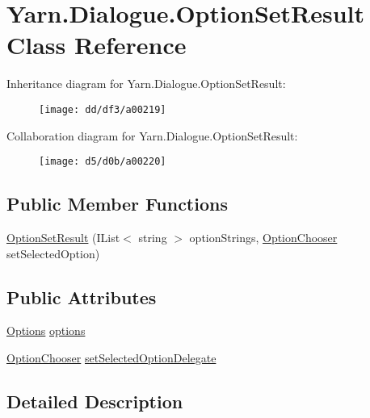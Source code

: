\hypertarget{a00060}{\section{Yarn.\-Dialogue.\-Option\-Set\-Result Class Reference}
\label{a00060}
}


Inheritance diagram for Yarn.\-Dialogue.\-Option\-Set\-Result\-:
\nopagebreak
\begin{figure}[H]
\begin{center}
\leavevmode
\texttt{[image: dd/df3/a00219]}
\end{center}
\end{figure}


Collaboration diagram for Yarn.\-Dialogue.\-Option\-Set\-Result\-:
\nopagebreak
\begin{figure}[H]
\begin{center}
\leavevmode
\texttt{[image: d5/d0b/a00220]}
\end{center}
\end{figure}
\subsection*{Public Member Functions}
\begin{DoxyCompactItemize}
\item 
\hyperlink{a00060_a934c02fb1047ffd05b2b5a9c6fcd7acb}{Option\-Set\-Result} (I\-List$<$ string $>$ option\-Strings, \hyperlink{a00026_a39866cbb03c03a35805d598b5d4ad553}{Option\-Chooser} set\-Selected\-Option)
\end{DoxyCompactItemize}
\subsection*{Public Attributes}
\begin{DoxyCompactItemize}
\item 
\hyperlink{a00026_d6/d7d/a00161}{Options} \hyperlink{a00060_abda9c3047ff9d3c3ec5540566a239315}{options}
\item 
\hyperlink{a00026_a39866cbb03c03a35805d598b5d4ad553}{Option\-Chooser} \hyperlink{a00060_a6f2683598cf0f62b76bb864640cc79dd}{set\-Selected\-Option\-Delegate}
\end{DoxyCompactItemize}


\subsection{Detailed Description}


